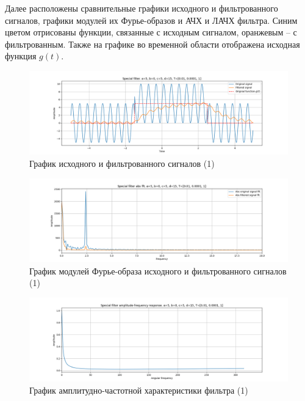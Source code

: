 \documentclass[a4paper, 12pt]{article}
\begin{document}
    Далее расположены сравнительные графики исходного и фильтрованного сигналов, графики модулей их Фурье-образов и АЧХ и ЛАЧХ фильтра.
    Синим цветом отрисованы функции, связанные с исходным сигналом, оранжевым -- с фильтрованным. Также на графике во временной области
    отображена исходная функция $g(t)$.
    \begin{figure}[H]
        \centering
        \includegraphics[scale=0.4]{1_fl2.png}
        \captionsetup{skip=0pt}
        \caption{График исходного и фильтрованного сигналов (1)}
        \label{fig:filin21}
    \end{figure}
    \begin{figure}[H]
        \centering
        \includegraphics[scale=0.4]{1_fl2_abs.png}
        \captionsetup{skip=0pt}
        \caption{График модулей Фурье-образа исходного и фильтрованного сигналов (1)}
        \label{fig:filinabs21}
    \end{figure}
    \begin{figure}[H]
        \centering
        \includegraphics[scale=0.4]{1_fl2_afr.png}
        \captionsetup{skip=0pt}
        \caption{График амплитудно-частотной характеристики фильтра (1)}
        \label{fig:filinafr21}
    \end{figure}
\end{document}
